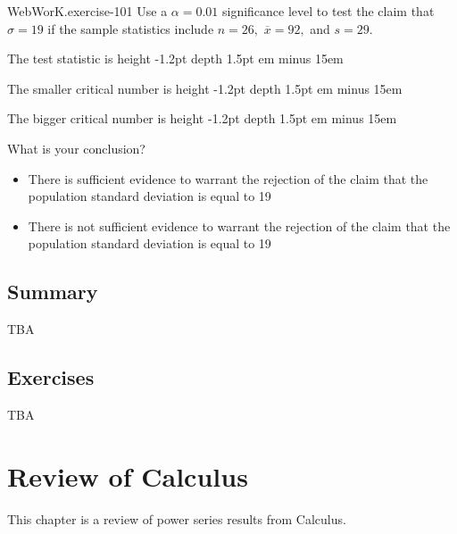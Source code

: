 \documentclass[10pt,]{book}
\newcommand{\fillin}[1]{\leavevmode\leaders\vrule height -1.2pt depth 1.5pt \hskip #1em minus #1em \null}
\numberwithin{equation}{section}
\begin{document}
\begin{inlineexercise}{WebWorK.}{exercise-101}%
\hypertarget{p-1426}{}%
Use a \(\alpha = 0.01\) significance level to test the claim that \(\sigma = 19\) if the sample statistics include \(n = 26,\) \(\overline{x} = 92,\) and \(s = 29.\)%
\par
\hypertarget{p-1427}{}%
The test statistic is  \fillin{15}%
\par
\hypertarget{p-1428}{}%
The smaller critical number is  \fillin{15}%
\par
\hypertarget{p-1429}{}%
The bigger critical number is  \fillin{15}%
\par
\hypertarget{p-1430}{}%
What is your conclusion?%
\par
\hypertarget{p-1431}{}%
\par
\begin{itemize}[label=$\odot$,leftmargin=3em,]
\item{}\hypertarget{p-1432}{}%
There is sufficient evidence to warrant the rejection of the claim that the population standard deviation is equal to 19%

\item{}\hypertarget{p-1433}{}%
There is not sufficient evidence to warrant the rejection of the claim that the population standard deviation is equal to 19%

\end{itemize}
%
\end{inlineexercise}
%
%
%
\typeout{************************************************}
\typeout{************************************************}
%
\section[{Summary}]{Summary}\label{section-77}
\hypertarget{p-1434}{}%
TBA%
%
%
\typeout{************************************************}
\typeout{************************************************}
%
\section[{Exercises}]{Exercises}\label{section-78}
\hypertarget{p-1435}{}%
TBA%
%
%
\typeout{************************************************}
\typeout{************************************************}
%
\chapter[{Review of Calculus}]{Review of Calculus}\label{PowerSeriesReview}
\hypertarget{p-1436}{}%
This chapter is a review of power series results from Calculus.%
%
%
\typeout{************************************************}
\typeout{************************************************}
%
\end{document}
